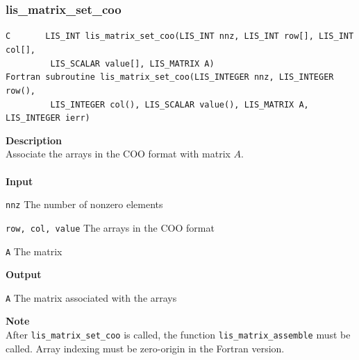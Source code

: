\documentclass[a4paper]{article}
\newcommand{\namelistlabel}[1]{\mbox{#1}\hfill}
\newenvironment{namelist}[1]{%
\begin{list}{}
  {\let\makelabel\namelistlabel
  \settowidth{\labelwidth}{#1}
  \setlength{\leftmargin}{1.1\labelwidth}}
  }{%
\end{list}}
\begin{document}
\newpage
\subsubsection{lis\_matrix\_set\_coo}
\begin{screen}
\verb|C       LIS_INT lis_matrix_set_coo(LIS_INT nnz, LIS_INT row[], LIS_INT col[],|\\
\verb|         LIS_SCALAR value[], LIS_MATRIX A)|\\
\verb|Fortran subroutine lis_matrix_set_coo(LIS_INTEGER nnz, LIS_INTEGER row(),|\\
\verb|         LIS_INTEGER col(), LIS_SCALAR value(), LIS_MATRIX A, LIS_INTEGER ierr)|
\end{screen}
{\bf Description}\\
\indent
Associate the arrays in the COO format with matrix $A$.
\\ \\
\noindent
{\bf Input}
\begin{namelist}{XXXXXXXXXXXXXXXXXXXX}
\item[\tt nnz] The number of nonzero elements
\item[\tt row, col, value] The arrays in the COO format
\item[\tt A] The matrix
\end{namelist}
{\bf Output}
\begin{namelist}{XXXXXXXXXXXXXXXXXXXX}
\item[\tt A] The matrix associated with the arrays
\end{namelist}
\noindent
{\bf Note}\\
\indent
After \verb|lis_matrix_set_coo| is called, 
the function \verb|lis_matrix_assemble| must be called. 
Array indexing must be zero-origin in the Fortran version.

\newpage
\end{document}
